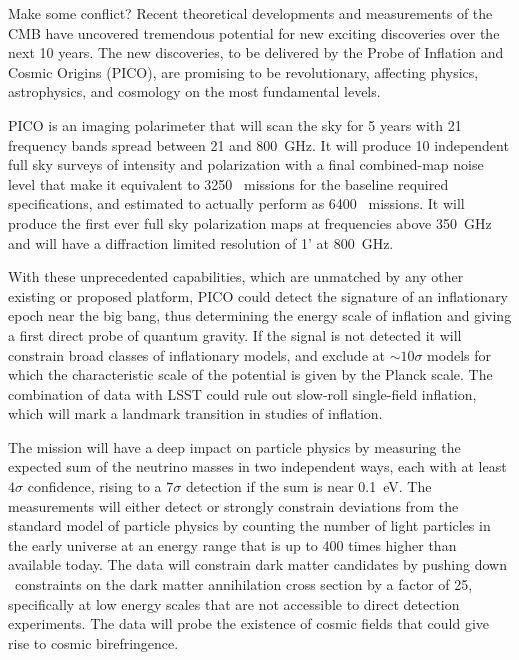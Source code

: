 \documentclass[PICOReport.tex]{subfiles}
\begin{document}
Make some conflict?
Recent theoretical developments and measurements of the \ac{CMB} have uncovered tremendous potential for new exciting discoveries over the next 10 years. The new discoveries, to be delivered by the Probe of Inflation and Cosmic Origins (PICO), are promising to be revolutionary, affecting physics, astrophysics, and cosmology on the most fundamental levels. 

PICO is an imaging polarimeter that will scan the sky for 5 years with 21 frequency bands spread between 21 and 800~GHz. It will produce 10 independent full sky surveys of intensity and polarization with a final combined-map noise level that make it equivalent to 3250 \planck\ missions for the baseline required specifications, and estimated to actually perform as 6400 \planck\ missions. It will produce the first ever full sky polarization maps at frequencies above 350~GHz and will have a diffraction limited resolution of 1' at 800~GHz. 

With these unprecedented capabilities, which are unmatched by any other existing or proposed platform, PICO could detect the signature of an inflationary epoch near the big bang, thus determining the energy scale of inflation and giving a first direct probe of quantum gravity. If the signal is not detected it will constrain broad classes of inflationary models, and exclude at $\sim10\sigma$ models for which the characteristic scale of the potential is given by the Planck scale. The combination of data with LSST could rule out slow-roll single-field inflation, which will mark a landmark transition in studies of inflation. 

The mission will have a deep impact on particle physics by measuring the expected sum of the neutrino masses in two independent ways, each with at least $4\sigma$ confidence, rising to a $7\sigma$ detection if the sum is near 0.1~eV. The measurements will either detect or strongly constrain deviations from the standard model of particle physics by counting the number of light particles in the early universe at an energy range that is up to 400 times higher than available today. The data will constrain dark matter candidates by pushing down \planck\ constraints on the dark matter annihilation cross section by a factor of 25, specifically at low energy scales that are not accessible to direct detection experiments. The data will probe the existence of cosmic fields that could give rise to cosmic birefringence. 
\end{document}

